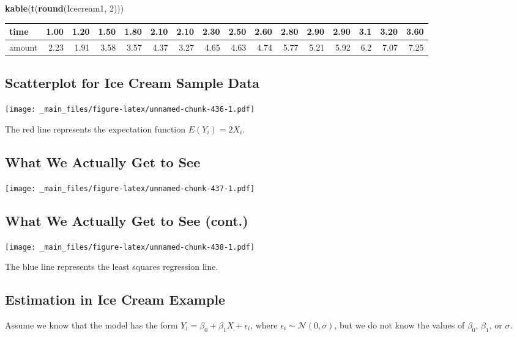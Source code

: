\documentclass[]{book}
\newenvironment{Shaded}{\begin{snugshade}}{\end{snugshade}}
\newcommand{\KeywordTok}[1]{\textcolor[rgb]{0.13,0.29,0.53}{\textbf{#1}}}
\newcommand{\DecValTok}[1]{\textcolor[rgb]{0.00,0.00,0.81}{#1}}
\newcommand{\NormalTok}[1]{#1}
\begin{document}
\begin{Shaded}
\begin{Highlighting}[]
\KeywordTok{kable}\NormalTok{(}\KeywordTok{t}\NormalTok{(}\KeywordTok{round}\NormalTok{(Icecream1, }\DecValTok{2}\NormalTok{)))}
\end{Highlighting}
\end{Shaded}

\begin{tabular}{l|r|r|r|r|r|r|r|r|r|r|r|r|r|r|r}
\hline
time & 1.00 & 1.20 & 1.50 & 1.80 & 2.10 & 2.10 & 2.30 & 2.50 & 2.60 & 2.80 & 2.90 & 2.90 & 3.1 & 3.20 & 3.60\\
\hline
amount & 2.23 & 1.91 & 3.58 & 3.57 & 4.37 & 3.27 & 4.65 & 4.63 & 4.74 & 5.77 & 5.21 & 5.92 & 6.2 & 7.07 & 7.25\\
\hline
\end{tabular}

\subsection{Scatterplot for Ice Cream Sample
Data}\label{scatterplot-for-ice-cream-sample-data}

\texttt{[image: \_main\_files/figure-latex/unnamed-chunk-436-1.pdf]}

The red line represents the expectation function \(E(Y_i) = 2X_i\).

\subsection{What We Actually Get to
See}\label{what-we-actually-get-to-see}

\texttt{[image: \_main\_files/figure-latex/unnamed-chunk-437-1.pdf]}

\subsection{What We Actually Get to See
(cont.)}\label{what-we-actually-get-to-see-cont.}

\texttt{[image: \_main\_files/figure-latex/unnamed-chunk-438-1.pdf]}

The blue line represents the least squares regression line.

\subsection{Estimation in Ice Cream
Example}\label{estimation-in-ice-cream-example}

Assume we know that the model has the form
\(Y_i=\beta_0 + \beta_1X + \epsilon_i\), where
\(\epsilon_i \sim \mathcal{N}(0,\sigma)\), but we do not know the values
of \(\beta_0\), \(\beta_1\), or \(\sigma\).
\end{document}
